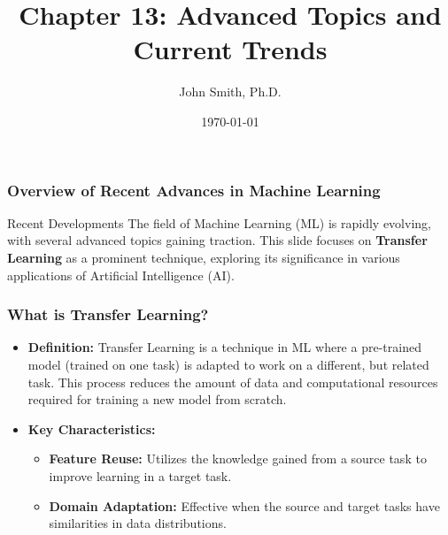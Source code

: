 \documentclass[aspectratio=169]{beamer}
\title[Chapter 13: Advanced Topics]{Chapter 13: Advanced Topics and Current Trends}
\author[J. Smith]{John Smith, Ph.D.}
\institute[University Name]{
  Department of Computer Science\\
  University Name\\
  \vspace{0.3cm}
  Email: email@university.edu\\
  Website: www.university.edu
}
\date{\today}
\begin{document}
\frame{\titlepage}

\begin{frame}[fragile]
    \titlepage
\end{frame}

\begin{frame}[fragile]
    \frametitle{Overview of Recent Advances in Machine Learning}
    \begin{block}{Recent Developments}
        The field of Machine Learning (ML) is rapidly evolving, with several advanced topics gaining traction. This slide focuses on \textbf{Transfer Learning} as a prominent technique, exploring its significance in various applications of Artificial Intelligence (AI).
    \end{block}
\end{frame}

\begin{frame}[fragile]
    \frametitle{What is Transfer Learning?}
    \begin{itemize}
        \item \textbf{Definition:} 
        Transfer Learning is a technique in ML where a pre-trained model (trained on one task) is adapted to work on a different, but related task. This process reduces the amount of data and computational resources required for training a new model from scratch.
        
        \item \textbf{Key Characteristics:}
        \begin{itemize}
            \item \textbf{Feature Reuse:} Utilizes the knowledge gained from a source task to improve learning in a target task.
            \item \textbf{Domain Adaptation:} Effective when the source and target tasks have similarities in data distributions.
        \end{itemize}
    \end{itemize}
\end{frame}
\end{document}

